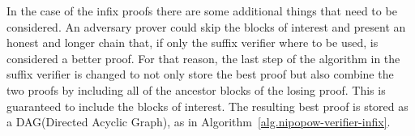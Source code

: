 



In the case of the infix proofs there are some additional things that need to
be considered. An adversary prover could skip the blocks of interest and
present an honest and longer chain that, if only the suffix verifier where to
be used, is considered a better proof. For that reason, the last step of the
algorithm in the suffix verifier is changed to not only store the best proof
but also combine the two proofs by including all of the ancestor blocks of the
losing proof. This is guaranteed to include the blocks of interest. The
resulting best proof is stored as a DAG(Directed Acyclic Graph), as in
Algorithm~\ref{alg.nipopow-verifier-infix}.
